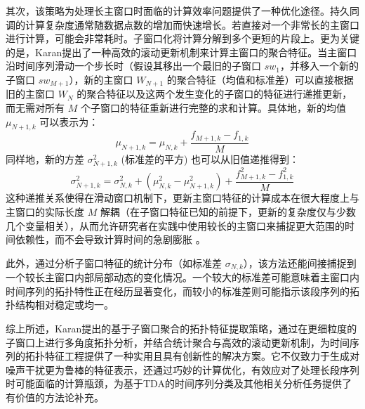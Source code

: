 其次，该策略为处理长主窗口时面临的计算效率问题提供了一种优化途径。持久同调的计算复杂度通常随数据点数的增加而快速增长。若直接对一个非常长的主窗口进行计算，可能会非常耗时。子窗口化将计算分解到多个更短的片段上。更为关键的是，Karan提出了一种高效的滚动更新机制来计算主窗口的聚合特征。当主窗口沿时间序列滑动一个步长时（假设其移出一个最旧的子窗口 $sw_1$，并移入一个新的子窗口 $sw_{M+1}$），新的主窗口 $W_{N+1}$ 的聚合特征（均值和标准差）可以直接根据旧的主窗口 $W_N$ 的聚合特征以及这两个发生变化的子窗口的特征进行递推更新，而无需对所有 $M$ 个子窗口的特征重新进行完整的求和计算。具体地，新的均值 $\mu_{N+1,k}$ 可以表示为：
\begin{equation}
    \mu_{N+1,k} = \mu_{N,k} + \frac{f_{M+1,k} - f_{1,k}}{M}
    \label{eq:recursive_mean}
\end{equation}
同样地，新的方差 $\sigma_{N+1,k}^2$ (标准差的平方) 也可以从旧值递推得到：
\begin{equation}
    \sigma_{N+1,k}^2 = \sigma_{N,k}^2 + (\mu_{N,k}^2 - \mu_{N+1,k}^2) + \frac{f_{M+1,k}^2 - f_{1,k}^2}{M}
    \label{eq:recursive_variance}
\end{equation}
这种递推关系使得在滑动窗口机制下，更新主窗口特征的计算成本在很大程度上与主窗口的实际长度 $M$ 解耦（在子窗口特征已知的前提下，更新的复杂度仅与少数几个变量相关），从而允许研究者在实践中使用较长的主窗口来捕捉更大范围的时间依赖性，而不会导致计算时间的急剧膨胀 。

此外，通过分析子窗口特征的统计分布（如标准差 $\sigma_{N,k}$），该方法还能间接捕捉到一个较长主窗口内部局部动态的变化情况。一个较大的标准差可能意味着主窗口内时间序列的拓扑特性正在经历显著变化，而较小的标准差则可能指示该段序列的拓扑结构相对稳定或均一。

综上所述，Karan提出的基于子窗口聚合的拓扑特征提取策略，通过在更细粒度的子窗口上进行多角度拓扑分析，并结合统计聚合与高效的滚动更新机制，为时间序列的拓扑特征工程提供了一种实用且具有创新性的解决方案。它不仅致力于生成对噪声干扰更为鲁棒的特征表示，还通过巧妙的计算优化，有效应对了处理长段序列时可能面临的计算瓶颈，为基于TDA的时间序列分类及其他相关分析任务提供了有价值的方法论补充。

